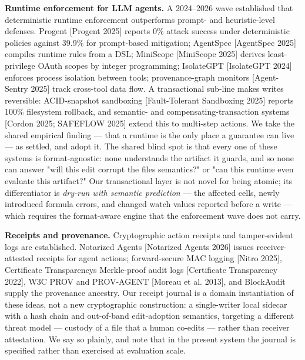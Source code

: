 \documentclass[
]{article}
\newcounter{none} %
\begin{document}
\textbf{Runtime enforcement for LLM agents.} A 2024--2026 wave
established that deterministic runtime enforcement outperforms prompt-
and heuristic-level defenses. Progent {[}Progent 2025{]} reports 0\%
attack success under deterministic policies against 39.9\% for
prompt-based mitigation; AgentSpec {[}AgentSpec 2025{]} compiles runtime
rules from a DSL; MiniScope {[}MiniScope 2025{]} derives least-privilege
OAuth scopes by integer programming; IsolateGPT {[}IsolateGPT 2024{]}
enforces process isolation between tools; provenance-graph monitors
{[}Agent-Sentry 2025{]} track cross-tool data flow. A transactional
sub-line makes writes reversible: ACID-snapshot sandboxing
{[}Fault-Tolerant Sandboxing 2025{]} reports 100\% filesystem rollback,
and semantic- and compensating-transaction systems {[}Cordon 2025;
SAFEFLOW 2025{]} extend this to multi-step actions. We take the shared
empirical finding --- that a runtime is the only place a guarantee can
live --- as settled, and adopt it. The shared blind spot is that every
one of these systems is format-agnostic: none understands the artifact
it guards, and so none can answer "will this edit corrupt the
file\textquotesingle s semantics?" or "can this runtime even evaluate
this artifact?" Our transactional layer is not novel for being atomic;
its differentiator is \emph{dry-run with semantic prediction} --- the
affected cells, newly introduced formula errors, and changed watch
values reported before a write --- which requires the format-aware
engine that the enforcement wave does not carry.

\textbf{Receipts and provenance.} Cryptographic action receipts and
tamper-evident logs are established. Notarized Agents {[}Notarized
Agents 2026{]} issues receiver-attested receipts for agent actions;
forward-secure MAC logging {[}Nitro 2025{]}, Certificate
Transparency\textquotesingle s Merkle-proof audit logs {[}Certificate
Transparency 2022{]}, W3C PROV and PROV-AGENT {[}Moreau et al. 2013{]},
and BlockAudit supply the provenance ancestry. Our receipt journal is a
domain instantiation of these ideas, not a new cryptographic
construction: a single-writer local sidecar with a hash chain and
out-of-band edit-adoption semantics, targeting a different threat model
--- custody of a file that a human co-edits --- rather than receiver
attestation. We say so plainly, and note that in the present system the
journal is specified rather than exercised at evaluation scale.
\end{document}
